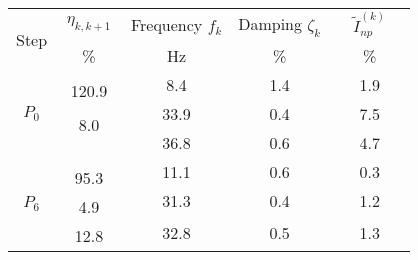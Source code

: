 \documentclass[11p]{article}
\begin{document}
\begin{tabular}{|c|cccc|}
\hline
\multicolumn{1}{|c}{\multirow{4}{*}{Step}} & 
\multicolumn{1}{|c|}{\multirow{2}{*}{$\ \eta_{k, k+1}\ $}} & 
\multicolumn{1}{c|}{\multirow{2}{*}{Frequency $f_k$}} & 
\multicolumn{1}{c|}{\multirow{2}{*}{Damping $\zeta_k$}} & 
\multicolumn{1}{c|}{\multirow{2}{*}{$\quad\tilde I_{np}^{(k)}\quad$}} \\
\multicolumn{1}{|c|}{} & \multicolumn{1}{c|}{} & \multicolumn{1}{c|}{} & \multicolumn{1}{c|}{} & \multicolumn{1}{c|}{} \\
 & 
\multicolumn{1}{c|}{\multirow{2}{*}{\%}} & 
\multicolumn{1}{c|}{\multirow{2}{*}{Hz}} & 
\multicolumn{1}{c|}{\multirow{2}{*}{\%}} & 
\multicolumn{1}{c|}{\multirow{2}{*}{\%}} \\
\multicolumn{1}{|c|}{} & \multicolumn{1}{c|}{} & \multicolumn{1}{c|}{} & \multicolumn{1}{c|}{} & \multicolumn{1}{c|}{} \\ \hline \hline
\multirow{6}{*}{$P_0$} &  & \multirow{2}{*}{8.4} & \multirow{2}{*}{1.4} & \multirow{2}{*}{1.9} \\ %
 & \multirow{2}{*}{120.9} & & & \\ \cline{3-5} 
 &  & \multirow{2}{*}{33.9} & \multirow{2}{*}{0.4} & \multirow{2}{*}{7.5} \\ %
 & \multirow{2}{*}{8.0} & & & \\ \cline{3-5} 
 & & \multirow{2}{*}{36.8} & \multirow{2}{*}{0.6} & \multirow{2}{*}{4.7} \\ %
 & & & \\ \hline \hline
\multirow{6}{*}{$P_6$} & & \multirow{2}{*}{11.1} & \multirow{2}{*}{0.6} & \multirow{2}{*}{0.3} \\ %
 & \multirow{2}{*}{95.3} & & & \\ \cline{3-5} 
 &  & \multirow{2}{*}{31.3} & \multirow{2}{*}{0.4} & \multirow{2}{*}{1.2} \\ %
 & \multirow{2}{*}{4.9} & & & \\ \cline{3-5} 
 &  & \multirow{2}{*}{32.8} & \multirow{2}{*}{0.5} & \multirow{2}{*}{1.3} \\ %
 & \multirow{2}{*}{12.8} & & & \\ \cline{3-5} 

\end{tabular}
\end{document}
